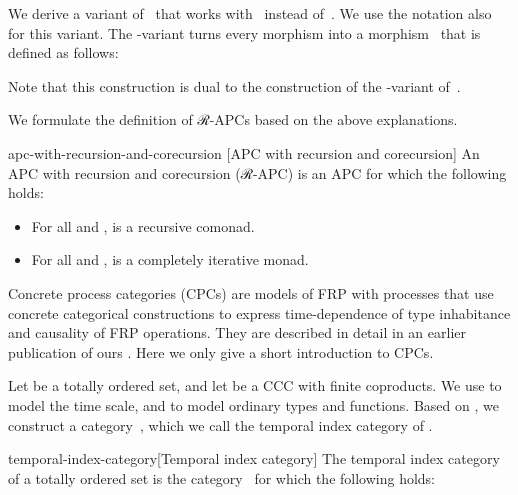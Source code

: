 \documentclass[copyright,creativecommons]{eptcs}
\begin{document}
We derive a variant of~ that works with~ instead of~. We use the
notation  also for this variant. The -variant turns every morphism  into a morphism~ that is defined as follows:

Note that this construction is dual to the construction of the -variant
of~.


We formulate the definition of ℛ-APCs based on the above explanations.

\begin{extdefinition}{apc-with-recursion-and-corecursion}
                     [APC with recursion and corecursion]
An APC with recursion and corecursion (ℛ-APC) is an APC  for
which the following holds:
\begin{itemize}

\item

For all  and , 
is a recursive comonad.

\item

For all  and , 
is a completely iterative monad.

\end{itemize}
\end{extdefinition}


Concrete process categories (CPCs) are models of FRP with processes that use
concrete categorical constructions to express time-dependence of type
inhabitance and causality of FRP operations. They are described in detail in an
earlier publication of ours \cite[Section~3]{jeltsch:plpv-2013}. Here we only
give a short introduction to CPCs.


Let  be a totally ordered set, and let  be a CCC with finite
coproducts. We use  to model the time scale, and  to model ordinary
types and functions. Based on , we construct a category~, which we
call the temporal index category of .

\begin{extdefinition}{temporal-index-category}[Temporal index category]
The temporal index category of a totally ordered set  is the
category~ for which the following holds:

\end{extdefinition}
\end{document}

